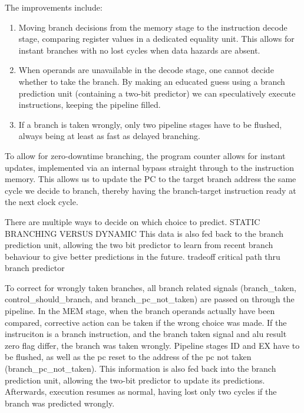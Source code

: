 The improvements include:
\begin{enumerate}
  \item
    Moving branch decisions from the memory stage to the instruction decode stage, comparing register values in a dedicated equality unit.
    This allows for instant branches with no lost cycles when data hazards are absent.
  \item
    When operands are unavailable in the decode stage, one cannot decide whether to take the branch.
    By making an educated guess using a branch prediction unit (containing a two-bit predictor) we can speculatively execute instructions, keeping the pipeline filled.
  \item
    If a branch is taken wrongly, only two pipeline stages have to be flushed, always being at least as fast as delayed branching.
\end{enumerate}

To allow for zero-downtime branching, the program counter allows for instant updates, implemented via an internal bypass straight through to the instruction memory.
This allows us to update the PC to the target branch address the same cycle we decide to branch, thereby having the branch-target instruction ready at the next clock cycle.

There are multiple ways to decide on which choice to predict.
STATIC BRANCHING VERSUS DYNAMIC
This data is also fed back to the branch prediction unit, allowing the two bit predictor to learn from recent branch behaviour to give better predictions in the future.
tradeoff critical path thru branch predictor

To correct for wrongly taken branches, all branch related signals (branch\_taken, control\_should\_branch, and branch\_pc\_not\_taken) are passed on through the pipeline.
In the MEM stage, when the branch operands actually have been compared, corrective action can be taken if the wrong choice was made.
If the instruciton is a branch instruction, and the branch taken signal and alu result zero flag differ, the branch was taken wrongly.
Pipeline stages ID and EX have to be flushed, as well as the pc reset to the address of the pc not taken (branch\_pc\_not\_taken).
This information is also fed back into the branch prediction unit, allowing the two-bit predictor to update its predictions.
Afterwards, execution resumes as normal, having lost only two cycles if the branch was predicted wrongly.
